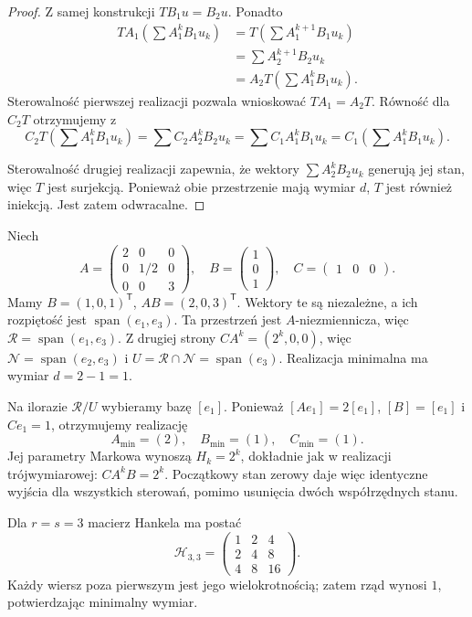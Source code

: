 \begin{proof}
Z samej konstrukcji
\(TB_1u=B_2u\).
Ponadto
\[
 \begin{aligned}
 TA_1\left(\sum A_1^kB_1u_k\right)
 &=T\left(\sum A_1^{k+1}B_1u_k\right)\\
 &=\sum A_2^{k+1}B_2u_k\\
 &=A_2T\left(\sum A_1^kB_1u_k\right).
 \end{aligned}
\]
Sterowalność pierwszej
realizacji pozwala
wnioskować \(TA_1=A_2T\).
Równość dla \(C_2T\)
otrzymujemy z
\[
 C_2T\left(\sum A_1^kB_1u_k\right)
 =\sum C_2A_2^kB_2u_k
 =\sum C_1A_1^kB_1u_k
 =C_1\left(\sum A_1^kB_1u_k\right).
\]

Sterowalność drugiej
realizacji zapewnia,
że wektory
\(\sum A_2^kB_2u_k\)
generują jej stan,
więc \(T\) jest surjekcją.
Ponieważ obie przestrzenie
mają wymiar \(d\),
\(T\) jest również iniekcją.
Jest zatem odwracalne.
\end{proof}

\begin{przyklad}
\label{prz:lin27-reduction}
Niech
\[
 A=\begin{pmatrix}
 2&0&0\\
 0&1/2&0\\
 0&0&3
 \end{pmatrix},
 \quad B=\begin{pmatrix}1\\0\\1\end{pmatrix},
 \quad C=\begin{pmatrix}1&0&0\end{pmatrix}.
\]
Mamy
\(B=(1,0,1)^{\mathsf T}\),
\(AB=(2,0,3)^{\mathsf T}\).
Wektory te są niezależne,
a ich rozpiętość
jest \(\operatorname{span}(e_1,e_3)\).
Ta przestrzeń jest
\(A\)-niezmiennicza,
więc
\(\mathcal R=\operatorname{span}(e_1,e_3)\).
Z drugiej strony
\(CA^k=(2^k,0,0)\),
więc
\(\mathcal N=\operatorname{span}(e_2,e_3)\)
i
\(U=\mathcal R\cap\mathcal N
 =\operatorname{span}(e_3)\).
Realizacja minimalna
ma wymiar
\(d=2-1=1\).

Na ilorazie \(\mathcal R/U\)
wybieramy bazę \([e_1]\).
Ponieważ \([Ae_1]=2[e_1]\),
\([B]=[e_1]\)
i \(Ce_1=1\),
otrzymujemy realizację
\[
 A_{\min}=(2),\quad
 B_{\min}=(1),\quad
 C_{\min}=(1).
\]
Jej parametry Markowa wynoszą
\(H_k=2^k\),
dokładnie jak w realizacji
trójwymiarowej:
\(CA^kB=2^k\).
Początkowy stan zerowy
daje więc identyczne
wyjścia dla wszystkich
sterowań, pomimo
usunięcia dwóch
współrzędnych stanu.

Dla \(r=s=3\)
macierz Hankela ma postać
\[
 \mathcal H_{3,3}
 =\begin{pmatrix}
  1&2&4\\2&4&8\\4&8&16
 \end{pmatrix}.
\]
Każdy wiersz poza pierwszym
jest jego wielokrotnością;
zatem rząd wynosi \(1\),
potwierdzając minimalny
wymiar.
\end{przyklad}


